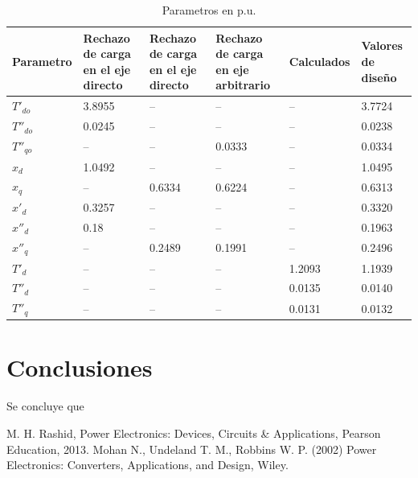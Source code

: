 \documentclass[conference]{IEEEtran}
\begin{document}
\setlength{\extrarowheight}{2pt} %
\begin{table}[ht]
\centering
\caption{Parametros en p.u.}
\setlength{\tabcolsep}{6pt}
\begin{tabular}{C{1cm} C{1cm} C{1cm} C{1cm} C{1cm} C{1.25cm}}
\toprule
\textbf{Parametro} &
\textbf{Rechazo de carga en el eje directo} &
\textbf{Rechazo de carga en el eje directo} &
\textbf{Rechazo de carga en eje arbitrario} &
\textbf{Calculados} & 
\textbf{Valores de diseño} \\
\hline
\midrule
$T'_{do}$ & 3.8955 & --     & --     & --     & 3.7724 \\
$T''_{do}$ & 0.0245 & --     & --     & --     & 0.0238 \\
$T''_{qo}$ & --     & --     & 0.0333 & --     & 0.0334 \\
$x_d$ & 1.0492 & --     & --     & --     & 1.0495 \\
$x_q$ & --     & 0.6334 & 0.6224 & --     & 0.6313 \\
$x'_d$ & 0.3257 & --     & --     & --     & 0.3320 \\
$x''_d$ & 0.18 & --     & --     & --     & 0.1963 \\
$x''_q$ & --     & 0.2489 & 0.1991 & --     & 0.2496 \\
$T'_d$ & --     & --     & --     & 1.2093 & 1.1939 \\
$T''_d$ & --     & --     & --     & 0.0135 & 0.0140 \\
$T''_q$ & --     & --     & --     & 0.0131 & 0.0132 \\
\bottomrule
\end{tabular}
\end{table}


\section{Conclusiones}
Se concluye que 

\begin{thebibliography}{plain}
 M. H. Rashid, Power Electronics: Devices, Circuits \& Applications, Pearson Education, 2013.
 Mohan N., Undeland T. M., Robbins W. P. (2002) Power Electronics: Converters, Applications, and Design, Wiley.
\end{thebibliography}
\end{document}
